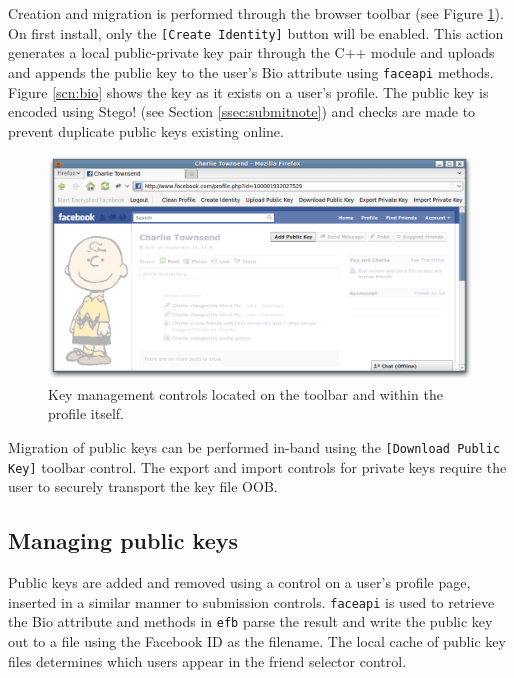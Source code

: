Creation and migration is performed through the browser toolbar (see Figure \ref{scn:pubkey}). On first install, only the {\tt [Create Identity]} button will be enabled. This action generates a local public-private key pair through the C++ module and uploads and appends the public key to the user's Bio attribute using {\tt faceapi} methods. Figure \ref{scn:bio} shows the key as it exists on a user's profile. The public key is encoded using Stego! (see Section \ref{ssec:submitnote}) and checks are made to prevent duplicate public keys existing online.

    \begin{figure}[tbph]
        \begin{center}
        
                \includegraphics[width=12cm]{screens/pubkey.png}

            \caption{Key management controls located on the toolbar and within the profile itself.}
            \label{scn:pubkey}
        \end{center}
    \end{figure}

Migration of public keys can be performed in-band using the {\tt [Download Public Key]} toolbar control. The export and import controls for private keys require the user to securely transport the key file OOB.

    
\subsection{Managing public keys}
\label{ssec:mankeys}

Public keys are added and removed using a control on a user's profile page, inserted in a similar manner to submission controls. {\tt faceapi} is used to retrieve the Bio attribute and methods in {\tt efb} parse the result and write the public key out to a file using the Facebook ID as the filename. The local cache of public key files determines which users appear in the friend selector control.
    
